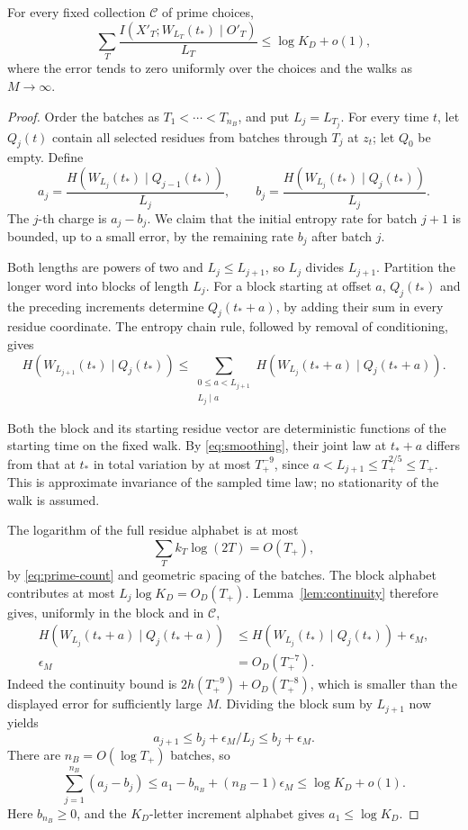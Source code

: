 \begin{lemma}
\label{lem:telescope}
For every fixed collection \(\mathcal C\) of prime choices,
\begin{equation}
 \sum_T\frac{I(X'_T;W_{L_T}(t_*)\mid O'_T)}{L_T}
 \le\log K_D+o(1),
 \label{eq:information-telescope}
\end{equation}
where the error tends to zero uniformly over the choices and the walks
as \(M\to\infty\).
\end{lemma}

\begin{proof}
Order the batches as \(T_1<\cdots<T_{n_B}\), and put
\(L_j=L_{T_j}\). For every time \(t\), let \(Q_j(t)\) contain
all selected residues from batches through \(T_j\) at \(z_t\);
let \(Q_0\) be empty. Define
\[
 a_j=\frac{H(W_{L_j}(t_*)\mid Q_{j-1}(t_*))}{L_j},
 \qquad
 b_j=\frac{H(W_{L_j}(t_*)\mid Q_j(t_*))}{L_j}.
\]
The \(j\)-th charge is \(a_j-b_j\). We claim that the initial
entropy rate for batch \(j+1\) is bounded, up to a small error,
by the remaining rate \(b_j\) after batch \(j\).

Both lengths are powers of two and \(L_j\le L_{j+1}\), so
\(L_j\) divides \(L_{j+1}\). Partition the longer word into
blocks of length \(L_j\). For a block starting at offset \(a\),
\(Q_j(t_*)\) and the preceding increments determine
\(Q_j(t_*+a)\), by adding their sum in every residue coordinate.
The entropy chain rule, followed by removal of conditioning, gives
\[
 H(W_{L_{j+1}}(t_*)\mid Q_j(t_*))
 \le\sum_{\substack{0\le a<L_{j+1}\\L_j\mid a}}
 H(W_{L_j}(t_*+a)\mid Q_j(t_*+a)).
\]

Both the block and its starting residue vector are deterministic
functions of the starting time on the fixed walk. By
\eqref{eq:smoothing}, their joint law at \(t_*+a\) differs from
that at \(t_*\) in total variation by at most \(T_+^{-9}\), since
\(a<L_{j+1}\le T_+^{2/5}\le T_+\). This is approximate invariance
of the sampled time law; no stationarity of the walk is assumed.

The logarithm of the full residue alphabet is at most
\[
 \sum_T k_T\log(2T)=O(T_+),
\]
by \eqref{eq:prime-count} and geometric spacing of the batches.
The block alphabet contributes at most
\(L_j\log K_D=O_D(T_+)\). Lemma~\ref{lem:continuity} therefore
gives, uniformly in the block and in \(\mathcal C\),
\[
 \begin{aligned}
 H(W_{L_j}(t_*+a)\mid Q_j(t_*+a))
 &\le H(W_{L_j}(t_*)\mid Q_j(t_*))+\epsilon_M,\\
 \epsilon_M&=O_D(T_+^{-7}).
 \end{aligned}
\]
Indeed the continuity bound is
\(2h(T_+^{-9})+O_D(T_+^{-8})\), which is smaller than the displayed
error for sufficiently large \(M\). Dividing the block sum by
\(L_{j+1}\) now yields
\[
 a_{j+1}\le b_j+\epsilon_M/L_j\le b_j+\epsilon_M.
\]
There are \(n_B=O(\log T_+)\) batches, so
\[
 \sum_{j=1}^{n_B}(a_j-b_j)
 \le a_1-b_{n_B}+(n_B-1)\epsilon_M
 \le\log K_D+o(1).
\]
Here \(b_{n_B}\ge0\), and the \(K_D\)-letter increment alphabet
gives \(a_1\le\log K_D\).
\end{proof}

